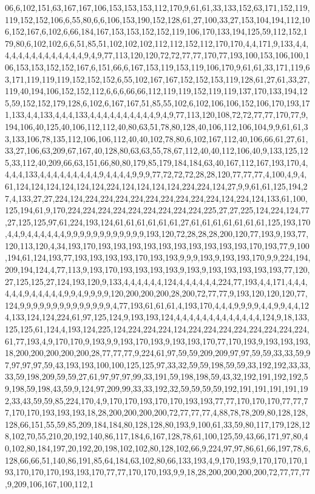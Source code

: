 06,6,102,151,63,167,167,106,153,153,153,112,170,9,61,61,33,133,152,63,171,152,119,119,152,152,106,6,55,80,6,6,106,153,190,152,128,61,27,100,33,27,153,104,194,112,106,152,167,6,102,6,66,184,167,153,153,152,152,119,106,170,133,194,125,59,112,152,179,80,6,102,102,6,6,51,85,51,102,102,102,112,112,152,112,170,170,4,4,171,9,133,4,4,4,4,4,4,4,4,4,4,4,4,4,4,9,4,9,77,113,120,120,72,72,77,77,170,77,193,100,153,106,100,106,153,153,152,152,167,6,151,66,6,167,153,119,153,119,106,170,9,61,61,33,171,119,63,171,119,119,119,152,152,152,6,55,102,167,167,152,152,153,119,128,61,27,61,33,27,119,40,194,106,152,152,112,6,6,6,66,66,112,119,119,152,119,119,137,170,133,194,125,59,152,152,179,128,6,102,6,167,167,51,85,55,102,6,102,106,106,152,106,170,193,171,133,4,4,133,4,4,4,133,4,4,4,4,4,4,4,4,4,4,9,4,9,77,113,120,108,72,72,77,77,170,77,9,194,106,40,125,40,106,112,112,40,80,63,51,78,80,128,40,106,112,106,104,9,9,61,61,33,133,106,78,135,112,106,106,112,40,40,102,78,80,6,102,167,112,40,106,66,61,27,61,33,27,106,63,209,67,167,40,128,80,63,63,55,78,67,112,40,40,112,106,40,9,133,125,125,33,112,40,209,66,63,151,66,80,80,179,85,179,184,184,63,40,167,112,167,193,170,4,4,4,4,133,4,4,4,4,4,4,4,4,4,9,4,4,4,4,9,9,9,77,72,72,72,28,28,120,77,77,77,4,100,4,9,4,61,124,124,124,124,124,124,224,124,124,124,124,224,224,124,27,9,9,61,61,125,194,27,4,133,27,27,224,124,224,224,224,224,224,224,224,224,224,124,224,124,133,61,100,125,194,61,9,170,224,224,224,224,224,224,224,224,224,225,27,27,225,124,224,124,77,27,125,125,97,61,224,193,124,61,61,61,61,61,61,27,61,61,61,61,61,61,61,125,193,170,4,4,9,4,4,4,4,4,4,9,9,9,9,9,9,9,9,9,9,9,9,193,120,72,28,28,28,200,120,77,193,9,193,77,120,113,120,4,34,193,170,193,193,193,193,193,193,193,193,193,193,170,193,77,9,100,194,61,124,193,77,193,193,193,193,170,193,193,9,9,9,193,9,193,193,170,9,9,224,194,209,194,124,4,77,113,9,193,170,193,193,193,193,9,193,9,193,193,193,193,193,77,120,27,125,125,27,124,193,120,9,133,4,4,4,4,4,4,124,4,4,4,4,4,4,224,77,193,4,4,171,4,4,4,4,4,4,9,4,4,4,4,4,9,9,4,9,9,9,9,120,200,200,200,28,200,72,77,77,9,193,120,120,120,77,124,9,9,9,9,9,9,9,9,9,9,9,9,9,9,4,77,193,61,61,61,4,193,170,4,4,4,9,9,9,9,4,4,9,9,4,4,124,133,124,124,224,61,97,125,124,9,193,193,124,4,4,4,4,4,4,4,4,4,4,4,4,4,124,9,18,133,125,125,61,124,4,193,124,225,124,224,224,224,124,224,224,224,224,224,224,224,224,61,77,193,4,9,170,170,9,193,9,9,193,170,193,9,193,193,170,77,170,193,9,193,193,193,18,200,200,200,200,200,28,77,77,77,9,224,61,97,59,59,209,209,97,97,59,59,33,33,59,97,97,97,97,59,43,193,193,100,100,125,125,97,33,32,59,59,198,59,59,33,192,192,33,33,33,59,198,209,59,59,27,61,97,97,97,99,33,191,59,198,198,59,43,32,192,191,192,192,59,198,59,198,43,59,9,124,97,209,99,33,33,192,32,59,59,59,59,192,191,191,191,191,192,33,43,59,59,85,224,170,4,9,170,170,193,170,170,193,193,77,77,170,170,170,77,77,77,170,170,193,193,193,18,28,200,200,200,200,72,77,77,77,4,88,78,78,209,80,128,128,128,66,151,55,59,85,209,184,184,80,128,128,80,193,9,100,61,33,59,80,117,179,128,128,102,70,55,210,20,192,140,86,117,184,6,167,128,78,61,100,125,59,43,66,171,97,80,40,102,80,184,197,20,192,20,198,102,102,80,128,102,66,9,224,97,97,86,61,66,197,78,6,128,66,66,51,140,86,191,85,64,184,63,102,80,66,133,193,4,9,170,193,9,170,170,170,193,170,170,170,193,193,170,77,77,170,170,193,9,9,18,28,200,200,200,200,72,77,77,77,9,209,106,167,100,112,1